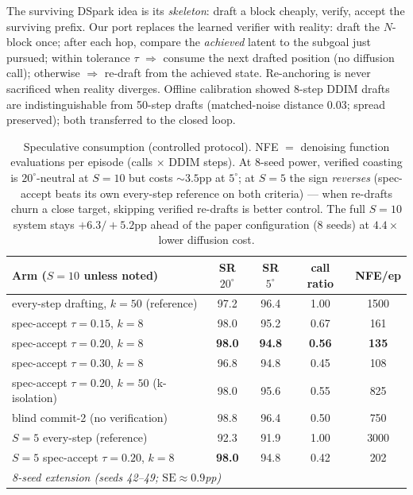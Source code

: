 \documentclass[11pt]{article}
\newcommand{\ours}[1]{\textbf{#1}}          %
\newcommand{\degc}[1]{$#1^\circ$}
\begin{document}
The surviving DSpark idea is its \emph{skeleton}: draft a block cheaply, verify, accept
the surviving prefix. Our port replaces the learned verifier with reality: draft the
$N$-block once; after each hop, compare the \emph{achieved} latent to the subgoal just
pursued; within tolerance $\tau$ $\Rightarrow$ consume the next drafted position (no
diffusion call); otherwise $\Rightarrow$ re-draft from the achieved state. Re-anchoring is
never sacrificed when reality diverges. Offline calibration showed 8-step DDIM drafts are
indistinguishable from 50-step drafts (matched-noise distance $0.03$; spread preserved);
both transferred to the closed loop.

\begin{table}[h]
\centering
\caption{Speculative consumption (controlled protocol). NFE $=$ denoising function
evaluations per episode (calls $\times$ DDIM steps). At 8-seed power, verified coasting
is \degc{20}-neutral at $S{=}10$ but costs ${\sim}3.5$pp at \degc{5}; at $S{=}5$ the sign
\emph{reverses} (spec-accept beats its own every-step reference on both criteria) --- when
re-drafts churn a close target, skipping verified re-drafts is better control. The full
$S{=}10$ system stays $+6.3/+5.2$pp ahead of the paper configuration (8 seeds) at
$4.4\times$ lower diffusion cost.}
\label{tab:spec}
\begin{tabular}{lcccc}
\toprule
Arm ($S{=}10$ unless noted) & SR \degc{20} & SR \degc{5} & call ratio & NFE/ep \\
\midrule
every-step drafting, $k{=}50$ (reference)          & 97.2 & 96.4 & 1.00 & 1500 \\
spec-accept $\tau{=}0.15$, $k{=}8$                  & 98.0 & 95.2 & 0.67 & 161 \\
spec-accept $\tau{=}0.20$, $k{=}8$                  & \ours{98.0} & \ours{94.8} & \ours{0.56} & \ours{135} \\
spec-accept $\tau{=}0.30$, $k{=}8$                  & 96.8 & 94.8 & 0.45 & 108 \\
spec-accept $\tau{=}0.20$, $k{=}50$ (k-isolation)   & 98.0 & 95.6 & 0.55 & 825 \\
blind commit-2 (no verification)                   & 98.8 & 96.4 & 0.50 & 750 \\
\midrule
$S{=}5$ every-step (reference)                     & 92.3 & 91.9 & 1.00 & 3000 \\
$S{=}5$ spec-accept $\tau{=}0.20$, $k{=}8$          & \ours{98.0} & 94.8 & 0.42 & 202 \\
\midrule
\multicolumn{5}{l}{\emph{8-seed extension (seeds 42--49; $\mathrm{SE}\approx0.9$pp)}} \\

\end{tabular}
\end{table}
\end{document}
